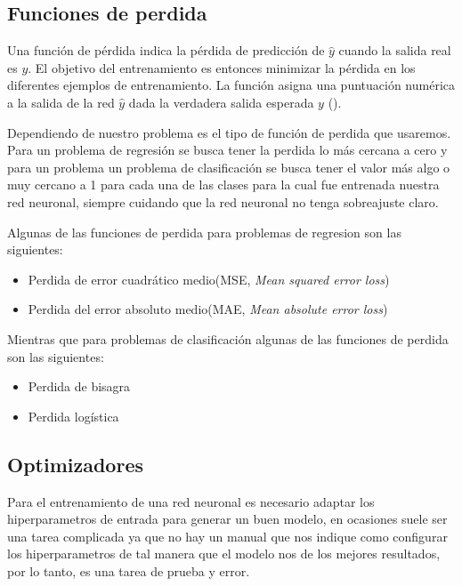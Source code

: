 \subsection{Funciones de perdida}

Una función de pérdida indica la pérdida de predicción de $\hat{y}$ cuando la salida real es $y$. El objetivo del entrenamiento es entonces minimizar la pérdida en los diferentes ejemplos de entrenamiento. La función asigna una puntuación numérica a la salida de la red $\hat{y}$ dada la verdadera salida esperada $y$ (\cite{goldberg2017Neural}).

Dependiendo de nuestro problema es el tipo de función de perdida que usaremos. Para un problema de regresión se busca tener la perdida lo más cercana a cero y para un problema un problema de clasificación se busca tener el valor más algo o muy cercano a 1 para cada una de las clases para la cual fue entrenada nuestra red neuronal, siempre cuidando que la red neuronal no tenga sobreajuste claro.

Algunas de las funciones de perdida para problemas de  regresion son las siguientes:

\begin{itemize}
    \item Perdida de error cuadrático medio(MSE, \textit{Mean squared error loss})
    \item Perdida del error absoluto medio(MAE, \textit{Mean absolute error loss})
\end{itemize}

Mientras que para problemas de clasificación algunas de las funciones de perdida son las siguientes:

\begin{itemize}
    \item Perdida de bisagra
    \item Perdida logística
\end{itemize}

\subsection{Optimizadores}

Para el entrenamiento de una red neuronal es necesario adaptar los hiperparametros de entrada para generar un buen modelo, en ocasiones suele ser una tarea complicada ya que no hay un manual que nos indique como configurar los hiperparametros de tal manera que el modelo nos de los mejores resultados, por lo tanto, es una tarea de prueba y error.

